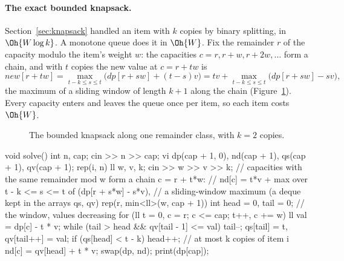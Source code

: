 \paragraph{The exact bounded knapsack.} Section~\ref{sec:knapsack} handled an item with $k$ copies by binary splitting, in
$\Oh{W \log k}$. A monotone queue does it in $\Oh{W}$. Fix the remainder $r$ of the capacity modulo the item's weight $w$: the
capacities $c = r, r + w, r + 2w, \dots$ form a chain, and with $t$ copies the new value at $c = r + tw$ is
\[
  \mathit{new}[r + tw] = \max_{t - k \le s \le t} \bigl(\mathit{dp}[r + sw] + (t - s)v\bigr)
  = tv + \max_{t - k \le s \le t} \bigl(\mathit{dp}[r + sw] - sv\bigr),
\]
the maximum of a sliding window of length $k + 1$ along the chain (Figure~\ref{fig:bknapmq}). Every capacity enters and leaves the
queue once per item, so each item costs $\Oh{W}$.

\begin{figure}[htbp]
\centering
{}
\caption{The bounded knapsack along one remainder class, with $k = 2$ copies.}
\label{fig:bknapmq}
\end{figure}

\begin{code}
void solve() {
    int n, cap;
    cin >> n >> cap;
    vi dp(cap + 1, 0), nd(cap + 1), qs(cap + 1), qv(cap + 1);
    rep(i, n) {
        ll w, v, k;
        cin >> w >> v >> k;
        // capacities with the same remainder mod w form a chain c = r + t*w:
        // nd[c] = t*v + max over t - k <= s <= t of (dp[r + s*w] - s*v),
        // a sliding-window maximum (a deque kept in the arrays qs, qv)
        rep(r, min<ll>(w, cap + 1)) {
            int head = 0, tail = 0;  // the window, values decreasing
            for (ll t = 0, c = r; c <= cap; t++, c += w) {
                ll val = dp[c] - t * v;
                while (tail > head && qv[tail - 1] <= val) tail--;
                qs[tail] = t, qv[tail++] = val;
                if (qs[head] < t - k) head++;  // at most k copies of item i
                nd[c] = qv[head] + t * v;
            }
        }
        swap(dp, nd);
    }
    print(dp[cap]);
}
\end{code}

